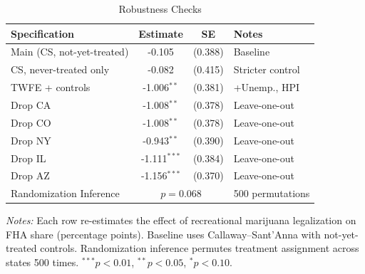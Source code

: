 \begin{table}[t]
\centering
\caption{Robustness Checks}
\label{tab:robust}
\begin{tabular}{lccl}
\hline\hline
Specification & Estimate & SE & Notes \\
\hline
\addlinespace
Main (CS, not-yet-treated) & -0.105 & (0.388) & Baseline \\
CS, never-treated only & -0.082 & (0.415) & Stricter control \\
TWFE + controls & -1.006$^{**}$ & (0.381) & +Unemp., HPI \\
Drop CA & -1.008$^{**}$ & (0.378) & Leave-one-out \\
Drop CO & -1.008$^{**}$ & (0.378) & Leave-one-out \\
Drop NY & -0.943$^{**}$ & (0.390) & Leave-one-out \\
Drop IL & -1.111$^{***}$ & (0.384) & Leave-one-out \\
Drop AZ & -1.156$^{***}$ & (0.370) & Leave-one-out \\
\addlinespace
Randomization Inference & \multicolumn{2}{c}{$p = 0.068$} & 500 permutations \\
\hline\hline
\end{tabular}
\begin{tablenotes}
\small
\item \textit{Notes:} Each row re-estimates the effect of recreational marijuana legalization on FHA share (percentage points). Baseline uses Callaway--Sant'Anna with not-yet-treated controls. Randomization inference permutes treatment assignment across states 500 times. $^{***}p<0.01$, $^{**}p<0.05$, $^{*}p<0.10$.
\end{tablenotes}
\end{table}
